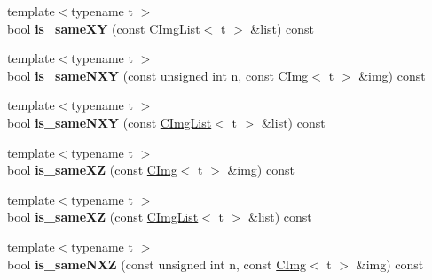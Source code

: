 \begin{DoxyCompactItemize}
\item 
\hypertarget{structcimg__library_1_1CImgList_ad19aca58581e33feaef0fdf888f58f3d}{
{\footnotesize template$<$typename t $>$ }\\bool {\bfseries is\_\-sameXY} (const \hyperlink{structcimg__library_1_1CImgList}{CImgList}$<$ t $>$ \&list) const }
\label{structcimg__library_1_1CImgList_ad19aca58581e33feaef0fdf888f58f3d}

\item 
\hypertarget{structcimg__library_1_1CImgList_a2feb87014ced3b5a31f65a0d676d3630}{
{\footnotesize template$<$typename t $>$ }\\bool {\bfseries is\_\-sameNXY} (const unsigned int n, const \hyperlink{structcimg__library_1_1CImg}{CImg}$<$ t $>$ \&img) const }
\label{structcimg__library_1_1CImgList_a2feb87014ced3b5a31f65a0d676d3630}

\item 
\hypertarget{structcimg__library_1_1CImgList_a8ea19c9c6d4317c0b93712bf3f932d13}{
{\footnotesize template$<$typename t $>$ }\\bool {\bfseries is\_\-sameNXY} (const \hyperlink{structcimg__library_1_1CImgList}{CImgList}$<$ t $>$ \&list) const }
\label{structcimg__library_1_1CImgList_a8ea19c9c6d4317c0b93712bf3f932d13}

\item 
\hypertarget{structcimg__library_1_1CImgList_ab1c89e89bd61546d5b0a98040c37356e}{
{\footnotesize template$<$typename t $>$ }\\bool {\bfseries is\_\-sameXZ} (const \hyperlink{structcimg__library_1_1CImg}{CImg}$<$ t $>$ \&img) const }
\label{structcimg__library_1_1CImgList_ab1c89e89bd61546d5b0a98040c37356e}

\item 
\hypertarget{structcimg__library_1_1CImgList_a16793039322edfa7707072a0cead6ab4}{
{\footnotesize template$<$typename t $>$ }\\bool {\bfseries is\_\-sameXZ} (const \hyperlink{structcimg__library_1_1CImgList}{CImgList}$<$ t $>$ \&list) const }
\label{structcimg__library_1_1CImgList_a16793039322edfa7707072a0cead6ab4}

\item 
\hypertarget{structcimg__library_1_1CImgList_a5868c1bd2bf5586112ab14f0fc031754}{
{\footnotesize template$<$typename t $>$ }\\bool {\bfseries is\_\-sameNXZ} (const unsigned int n, const \hyperlink{structcimg__library_1_1CImg}{CImg}$<$ t $>$ \&img) const }
\label{structcimg__library_1_1CImgList_a5868c1bd2bf5586112ab14f0fc031754}


\end{DoxyCompactItemize}
